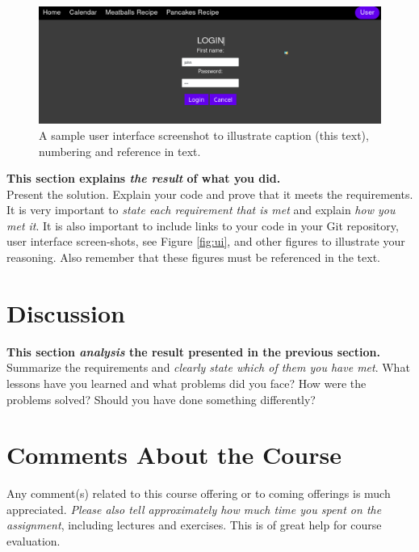 \documentclass[a4paper]{scrartcl}
\begin{document}
\begin{figure}[h!]
  \begin{center}
    \includegraphics[scale=0.3]{images/login_form.png}
    \caption{A sample user interface screenshot to illustrate caption (this text), numbering and reference in text.}
    \label{fig:login_form}
  \end{center}
\end{figure}

\textbf{This section explains \textit{the result} of what you did.} \\

\noindent Present the solution. Explain your code and prove that it meets the requirements. It is very important to \textit{state each requirement that is met} and explain \textit{how you met it}. It is also important to include links to your code in your Git repository, user interface screen-shots, see Figure \ref{fig:ui}, and other figures to illustrate your reasoning. Also remember that these figures must be referenced in the text.

\section{Discussion}

\textbf{This section \textit{analysis} the result presented in the previous section.} \\

\noindent Summarize the requirements and \textit{clearly state which of them you have met}. What lessons have you learned and what problems did you face? How were the problems solved? Should you have done something differently?

\section{Comments About the Course}

Any comment(s) related to this course offering or to coming offerings is much appreciated. \textit{Please also tell approximately how much time you spent on the assignment}, including lectures and exercises. This is of great help for course evaluation.
\end{document}
